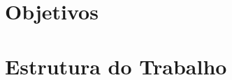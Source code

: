 






\section{Objetivos}
\label{cap1:Sec:Objetivos}


\section{Estrutura do Trabalho}
\label{cap1:Sec:EstruturaTrabalho}

